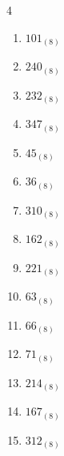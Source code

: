 \begin{multicols}{4}
\begin{enumerate}
        \phantom{$=188$}

  \item $101_{(8)}$

        \phantom{$=65$}

  \item $240_{(8)}$

        \phantom{$=160$}

  \item $232_{(8)}$

        \phantom{$=154$}

  \item $347_{(8)}$

        \phantom{$=231$}

  \item $45_{(8)}$

        \phantom{$=37$}

  \item $36_{(8)}$

        \phantom{$=30$}

  \item $310_{(8)}$

        \phantom{$=200$}

  \item $162_{(8)}$

        \phantom{$=114$}

  \item $221_{(8)}$

        \phantom{$=145$}

  \item $63_{(8)}$

        \phantom{$=51$}

\columnbreak %

  \item $66_{(8)}$

        \phantom{$=54$}

  \item $71_{(8)}$

        \phantom{$=57$}

  \item $214_{(8)}$

        \phantom{$=140$}

  \item $167_{(8)}$

        \phantom{$=119$}

  \item $312_{(8)}$

        \phantom{$=202$}


\end{enumerate}
\end{multicols}
